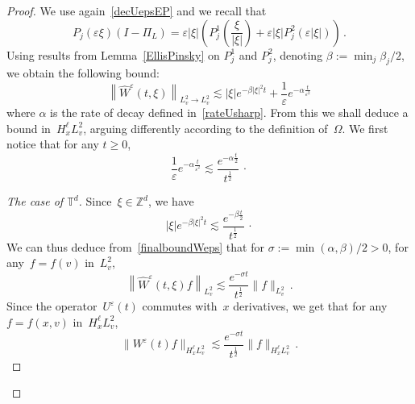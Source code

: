 \documentclass[11pt]{article}
\theoremstyle{definition}
\numberwithin{equation}{section}
\numberwithin{figure}{section}
\numberwithin{table}{section}
\newenvironment{step}[1]{\begin{proof}[#1]}{\let\qed\relax\end{proof}}
\newcommand*\T {\mathbb{T}}
\newcommand*\Z {\mathbb{Z}}
\newcommand*\eps{{\varepsilon}}
\newcommand*\e{{\varepsilon}}
\begin{document}
\begin{proof}
We use again~\eqref{decUepsEP} and we recall that
\[
P_j(\e \xi)(I-\Pi_{L})= \e|\xi| \left(P^1_{j}\left(\frac{\xi}{|\xi|}\right) + \e |\xi| P^2_{j}(\e |\xi|)\right)\,.
\]
Using results from Lemma~\ref{EllisPinsky} on $P^1_j$ and $P^2_j$, denoting $\beta := \min_j \beta_j/2$, we obtain the following bound:
\begin{equation}\label{finalboundWeps}
\left\|\widehat W^\e(t,\xi)\right\|_{L^2_v \to L^2_v} \lesssim |\xi| e^{-\beta |\xi|^2t} + \frac{1}{\e} e^{-\alpha \frac{t}{\e^2}}
\end{equation}
where $\alpha$ is the rate of decay defined in~\eqref{rateUsharp}. From this we shall deduce a bound in~$H^\ell_xL^2_v$, arguing differently according to the definition of~$\Omega$. We first notice that for any $t \ge 0$,
\begin{equation}\label{texp}
\frac{1}{\e} e^{-\alpha \frac{t}{\e^2}} \lesssim \frac{e^{-\alpha \frac{t}{2}}}{t^\frac12} \, \cdotp
\end{equation}

\begin{step}{The case of $\T^d$}
Since~$\xi \in \Z^d$, we have
\[
|\xi| e^{-\beta |\xi|^2t} \lesssim \frac{e^{-\beta \frac{t}{2}} }{t^\frac12}\, \cdotp
\]
We can thus deduce from~\eqref{finalboundWeps} that for $\sigma:=\min(\alpha,\beta)/2>0$, for any~$f = f(v)$ in~$L^2_v$,
\[
\left\|\widehat W^\e(t,\xi)f\right\|_{L^2_v} \lesssim \frac{e^{- \sigma t}}{t^\frac12} \|f\|_{L^2_v} \,.
\]
Since the operator~$U^\eps(t)$ commutes with~$x$ derivatives, we get that for any~$f = f(x,v) $ in~$ H^\ell_xL^2_v$,
\[
\|W^\e(t) f\|_{H^\ell_xL^2_v} \lesssim \frac{e^{-\sigma t}}{t^\frac12} \|f\|_{H^\ell_xL^2_v}\,.
\]
\end{step}


\end{proof}
\end{document}
